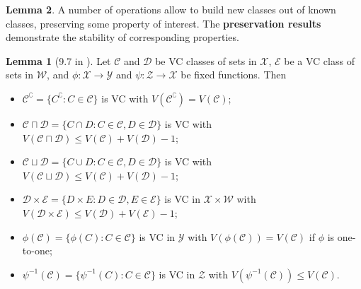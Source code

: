 \documentclass[11pt, a3paper, openany]{article}
\theoremstyle{remark}
\newcounter{Lem}[section]
\theoremstyle{remark}
\theoremstyle{remark}
\newenvironment{Proof of claim}
  {\begin{proof}[\normalfont \textbf{Proof of claim}]}
  {\end{proof}}
\theoremstyle{definition}
\newtheorem*{Lemma}{Lemma}
\theoremstyle{remark}
\theoremstyle{plain}
\begin{document}
\begin{Lemma}
A number of operations allow to build new classes out of known classes, preserving some property of interest. The \textbf{preservation results} demonstrate the stability of corresponding properties.

\begin{Lemma}[9.7 in \cite{Kosorok2008Introduction}]
Let $\mathcal{C}$ and $\mathcal{D}$ be VC classes of sets in $\mathcal{X}$, $\mathcal{E}$ be a VC class of sets in $\mathcal{W}$, and $\phi : \mathcal{X} \to \mathcal{Y}$ and $\psi : \mathcal{Z} \to \mathcal{X}$ be fixed functions. Then
\begin{itemize}
\setlength{\itemsep}{0pt}
\item $\mathcal{C}^{\complement} = \{ C^{\complement} : C \in \mathcal{C} \}$ is VC with $V(\mathcal{C}^{\complement}) = V(\mathcal{C})$;
\item $\mathcal{C} \sqcap \mathcal{D} = \{ C \cap D : C \in \mathcal{C}, D \in \mathcal{D} \}$ is VC with $V(\mathcal{C} \sqcap \mathcal{D}) \leq V(\mathcal{C}) + V(\mathcal{D}) - 1$;
\item $\mathcal{C} \sqcup \mathcal{D} = \{ C \cup D : C \in \mathcal{C}, D \in \mathcal{D} \}$ is VC with $V(\mathcal{C} \sqcup \mathcal{D}) \leq V(\mathcal{C}) + V(\mathcal{D}) - 1$;
\item $\mathcal{D} \times \mathcal{E} = \{ D \times E : D \in \mathcal{D}, E \in \mathcal{E} \}$ is VC in $\mathcal{X} \times \mathcal{W}$ with $V(\mathcal{D} \times \mathcal{E}) \leq V(\mathcal{D}) + V(\mathcal{E}) - 1$;
\item $\phi(\mathcal{C}) = \{ \phi(C) : C \in \mathcal{C} \}$ is VC in $\mathcal{Y}$ with $V(\phi(\mathcal{C})) = V(\mathcal{C})$ if $\phi$ is one-to-one;
\item $\psi^{-1}(\mathcal{C}) = \{ \psi^{-1}(C) : C \in \mathcal{C} \}$ is VC in $\mathcal{Z}$ with $V(\psi^{-1}(\mathcal{C})) \leq V(\mathcal{C})$.
\end{itemize}
\end{Lemma}


\end{Lemma}
\end{document}
